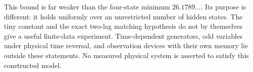 This bound is far weaker than the four-state minimum $26.1789\ldots$.
Its purpose is different: it holds uniformly over an unrestricted number
of hidden states. The tiny constant and the exact two-lag matching
hypothesis do not by themselves give a useful finite-data experiment.
Time-dependent generators, odd variables under physical time reversal,
and observation devices with their own memory lie outside these statements.
No measured physical system is asserted to satisfy this constructed model.


